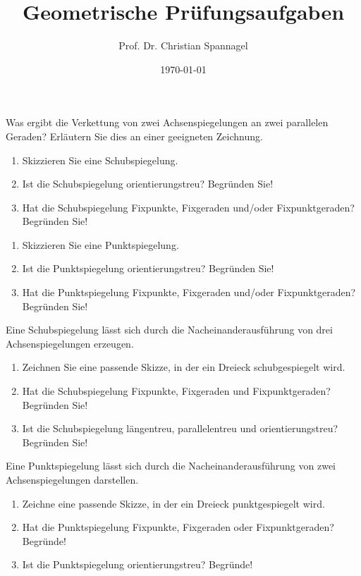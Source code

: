\documentclass{cssheet}
\title{Geometrische Prüfungsaufgaben}
\author{Prof. Dr. Christian Spannagel}
\date{\today}
\begin{document}
\printtitle

\begin{aufgabe}[WiSe 16/17]
	Was ergibt die Verkettung von zwei Achsenspiegelungen an zwei parallelen Geraden? Erläutern Sie dies an einer geeigneten Zeichnung.
\end{aufgabe}

\begin{aufgabe}[SoSe 17, HT]
	\begin{enumerate}
		\item Skizzieren Sie eine Schubspiegelung.
		\item Ist die Schubspiegelung orientierungstreu? Begründen Sie!
		\item Hat die Schubspiegelung Fixpunkte, Fixgeraden und/oder Fixpunktgeraden? Begründen Sie!
	\end{enumerate}
\end{aufgabe}

\begin{aufgabe}[SoSe 17, NT]
	\begin{enumerate}
		\item Skizzieren Sie eine Punktspiegelung.
		\item Ist die Punktspiegelung orientierungstreu? Begründen Sie!
		\item Hat die Punktspiegelung Fixpunkte, Fixgeraden und/oder Fixpunktgeraden? Begründen Sie!
	\end{enumerate}
\end{aufgabe}

\begin{aufgabe}[SoSe 22]
	Eine Schubspiegelung lässt sich durch die Nacheinanderausführung von drei Achsenspiegelungen erzeugen.
	\begin{enumerate}
		
		\item Zeichnen Sie eine passende Skizze, in der ein Dreieck schubgespiegelt wird.
		\item Hat die Schubspiegelung Fixpunkte, Fixgeraden und Fixpunktgeraden? Begründen Sie!
		\item Ist die Schubspiegelung längentreu, parallelentreu und orientierungstreu? Begründen Sie!
	\end{enumerate}
\end{aufgabe}

\begin{aufgabe}[WiSe 23/24]
	Eine Punktspiegelung lässt sich durch die Nacheinanderausführung von zwei Achsenspiegelungen darstellen.
	\begin{enumerate}
		\item Zeichne eine passende Skizze, in der ein Dreieck punktgespiegelt wird.
		\item Hat die Punktspiegelung Fixpunkte, Fixgeraden oder Fixpunktgeraden? Begründe!
		\item Ist die Punktspiegelung orientierungstreu? Begründe!
	\end{enumerate}
\end{aufgabe}


\vspace*{10mm}
\printlicense

\printsocials
\end{document}
